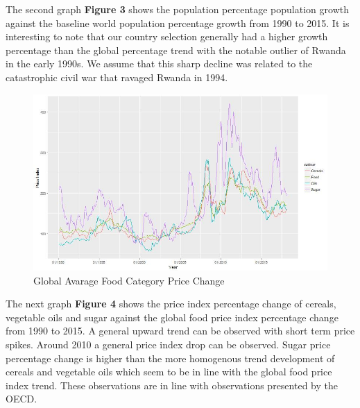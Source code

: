 \documentclass[12pt,a4paper,english]{article}
\begin{document}
The second graph \textbf{Figure 3} shows the population percentage population growth against the baseline world population percentage growth from 1990 to 2015. It is interesting to note that our country selection generally had a higher growth percentage than the global percentage trend with the notable outlier of Rwanda in the early 1990s. We assume that this sharp decline was related to the catastrophic civil war that ravaged Rwanda in 1994. 

\FloatBarrier
\begin{figure}[!htb]
\begin{center}
\includegraphics[scale=0.50]{price_index.jpg}
\caption{Global Avarage Food Category Price Change}
\label{figure4}
\end{center}
\end{figure}
\FloatBarrier

The next graph \textbf{Figure 4} shows the price index percentage change of cereals, vegetable oils and sugar against the global food price index percentage change from 1990 to 2015. A general upward trend can be observed with short term price spikes. Around 2010 a general price index drop can be observed. Sugar price percentage change is higher than the more homogenous trend development of cereals and vegetable oils which seem to be in line with the global food price index trend. These observations are in line with observations presented by the OECD. 
\end{document}
